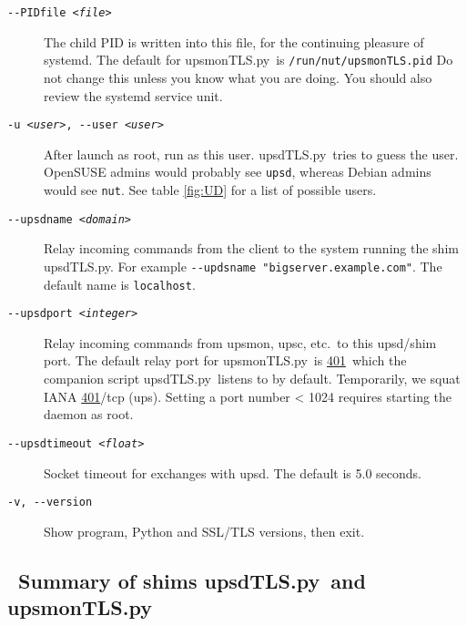 \documentclass[12pt]{article}
\newlength{\headersep}\setlength{\headersep}{3mm}
\newcommand{\Hsep}{\hspace{\headersep}}
\newcommand{\newcolumn}{\vfill\eject}
\newcommand{\upsd}{\mbox{\textcolor{UPSDCOLOUR}{upsd}}}
\newcommand{\upsmon}{\mbox{\textcolor{MONCOLOUR}{upsmon}}}
\newcommand{\upsc}{\mbox{\textcolor{UPSMONCOLOUR}{upsc}}}
\newcommand{\upsdTLS}{\mbox{\textcolor{UPSDCOLOUR}{upsdTLS.py}}}
\newcommand{\upsmonTLS}{\mbox{\textcolor{UPSMONCOLOUR}{upsmonTLS.py}}}
\newcommand{\IANAups}{\href{https://www.iana.org/assignments/service-names-port-numbers/service-names-port-numbers.xhtml?search=401}%
                           {401}}
\begin{document}
\begin{description}
\item[\texttt{-\/-PIDfile \textit{<file>}}] The child PID is written
  into this file, for the continuing pleasure of systemd.  The default
  for \upsmonTLS\ is \texttt{/run/nut/{\allowbreak}upsmonTLS.pid} Do
  not change this unless you know what you are doing.  You should also
  review the systemd service unit.

\item[\texttt{-u \textit{<user>}, -\/-user \textit{<user>}}] After
  launch as root, run as this user.  \upsdTLS\ tries to guess the
  user. OpenSUSE admins would probably see \texttt{upsd}, whereas
  Debian admins would see \texttt{nut}.  See table \ref{fig:UD} for a
  list of possible users.

\item[\texttt{-\/-upsdname \textit{<domain>}}] Relay incoming commands
  from the client to the system running the shim \upsdTLS.  For
  example \texttt{-\/-updsname "bigserver.example.com"}. The default
  name is \texttt{localhost}.

\item[\texttt{-\/-upsdport \textit{<integer>}}] Relay incoming
  commands from \upsmon, \upsc, etc.\ to this upsd/shim port. The
  default relay port for \upsmonTLS\ is \IANAups\ which the companion
  script \upsdTLS\ listens to by default.  Temporarily, we squat IANA
  \IANAups/tcp (ups). Setting a port number < 1024 requires starting
  the daemon as root.
  
\item[\texttt{-\/-upsdtimeout \textit{<float>}}] Socket timeout for
  exchanges with \upsd. The default is 5.0 seconds.

\item[\texttt{-v, -\/-version}] Show program, Python and SSL/TLS
  versions, then exit.

\end{description}

\vspace*{\fill}

\begin{center}
\end{center}

\vspace*{\fill}

\newcolumn
\subsection{\Hsep\ Summary of shims \upsdTLS\ and \upsmonTLS}\label{section:shimsummary}
\end{document}
